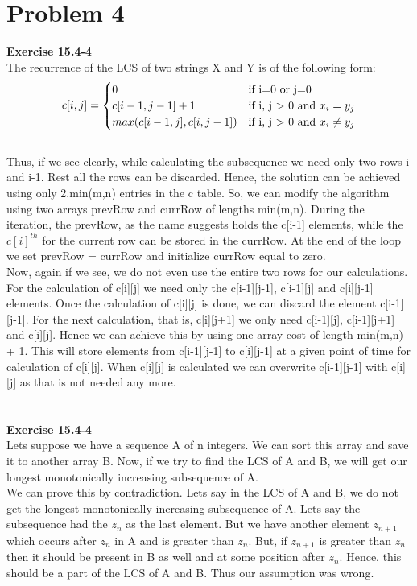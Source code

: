 \documentclass[10pt]{article}
\begin{document}
\section{Problem 4}
\textbf{Exercise 15.4-4}\\
The recurrence of the LCS of two strings X and Y is of the following form:\\
\[
c[i,j] = 
\begin{cases}
0 \hfill & \text{if i=0 or j=0}\\
c[i-1,j-1] + 1 \hfill & \text{if i, j $>$ 0  and $x_i = y_j$}\\
max(c[i-1, j] , c[i,j-1]) \hfill & \text{if i, j $>$ 0  and $x_i \neq y_j$}\\
\end{cases}
\]\\
Thus, if we see clearly, while calculating the subsequence we need only two rows i and i-1. Rest all the rows can be discarded. Hence, the solution can be achieved using only 2.min(m,n) entries in the c table.
So, we can modify the algorithm using two arrays prevRow and currRow of lengths min(m,n). During the iteration, the prevRow, as the name suggests holds the c[i-1] elements, while the $c[i]^{th} $ for the current row can be stored in the currRow. At the end of the loop we set prevRow = currRow and initialize currRow equal to zero.\\
Now, again if we see, we do not even use the entire two rows for our calculations. For the calculation of c[i][j] we need only the c[i-1][j-1], c[i-1][j] and c[i][j-1] elements. Once the calculation of c[i][j] is done, we can discard the element c[i-1][j-1]. For the next calculation, that is, c[i][j+1] we only need c[i-1][j], c[i-1][j+1] and c[i][j]. Hence we can achieve this by using one array cost of length min(m,n) + 1. This will store elements from c[i-1][j-1] to c[i][j-1] at a given point of time for calculation of c[i][j]. When c[i][j] is calculated we can overwrite c[i-1][j-1] with c[i][j] as that is not needed any more.\\\\\\
\textbf{Exercise 15.4-4}\\
Lets suppose we have a sequence A of n integers. We can sort this array and save it to another array B. Now, if we try to find the LCS of A and B, we will get our longest monotonically increasing subsequence of A.\\
We can prove this by contradiction. Lets say in the LCS of A and B, we do not get the longest monotonically increasing subsequence of A. Lets say the subsequence had the $z_n$ as the last element. But we have another element $z_{n+1}$ which occurs after $z_n$ in A and is greater than $z_n$. But, if $z_{n+1}$ is greater than $z_n$ then it should be present in B as well and at some position after $z_n$. Hence, this should be a part of the LCS of A and B. Thus our assumption was wrong.
\newpage
\end{document}
